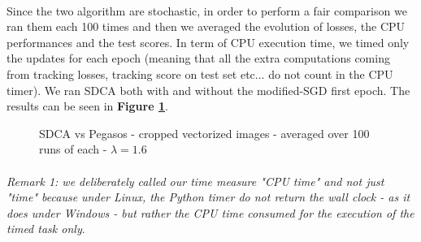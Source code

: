 \documentclass[10pt,a4paper]{article}
\begin{document}
\paragraph{}
Since the two algorithm are stochastic, in order to perform a fair comparison we ran them each 100 times and then we averaged the evolution of losses, the CPU performances and the test scores. In term of CPU execution time, we timed only the updates for each epoch (meaning that all the extra computations coming from tracking losses, tracking score on test set etc... do not count in the CPU timer). We ran SDCA both with and without the modified-SGD first epoch. The results can be seen in \textbf{Figure \ref{comparison_original}}.


\begin{figure}[!tbp]
  \centering
  \hfill
  \hfill
  \caption{SDCA vs Pegasos - cropped vectorized images - averaged over 100 runs of each - $\lambda = 1.6$}\label{comparison_original}
\end{figure}

\paragraph{}
\textit{Remark 1: we deliberately called our time measure "CPU time" and not just "time" because under Linux, the Python timer do not return the wall clock - as it does under Windows - but rather the CPU time consumed for the execution of the timed task only}.
\end{document}
